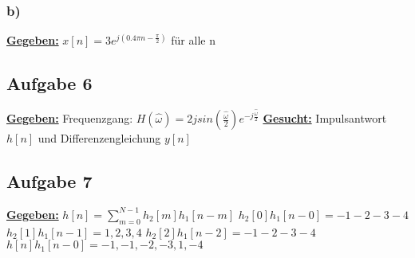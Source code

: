 \documentclass[12pt]{scrreprt}
\begin{document}
\subsubsection*{b)}
\underline{\textbf{Gegeben:}}\newline
\hspace*{5mm}$x[n]=3e^{j(0.4\pi n - \frac{\pi}{2})}$ für alle n\newline
\hspace*{5mm}

\subsection*{Aufgabe 6}
\underline{\textbf{Gegeben:}}\newline
\hspace*{5mm}Frequenzgang: $H(\hat{\omega})=2jsin(\frac{\hat{\omega}}{2})e^{-j\frac{\hat{\omega}}{2}}$\newline
\underline{\textbf{Gesucht:}}\newline
\hspace*{5mm}Impulsantwort $h[n]$ und Differenzengleichung $y[n]$\newline

\subsection*{Aufgabe 7}
\underline{\textbf{Gegeben:}}\newline
\hspace*{5mm}$h[n]=\sum_{m=0}^{N-1}h_2[m]h_1[n-m]$\newline
\hspace*{5mm}$h_2[0]h_1[n-0]={-1 -2 -3 -4}$\newline
\hspace*{5mm}$h_2[1]h_1[n-1]={1, 2, 3, 4}$\newline
\hspace*{5mm}$h_2[2]h_1[n-2]={-1 -2 -3 -4}$\newline
\hspace*{5mm}$h[n]h_1[n-0]={-1, -1, -2, -3, 1, -4}$
\end{document}
